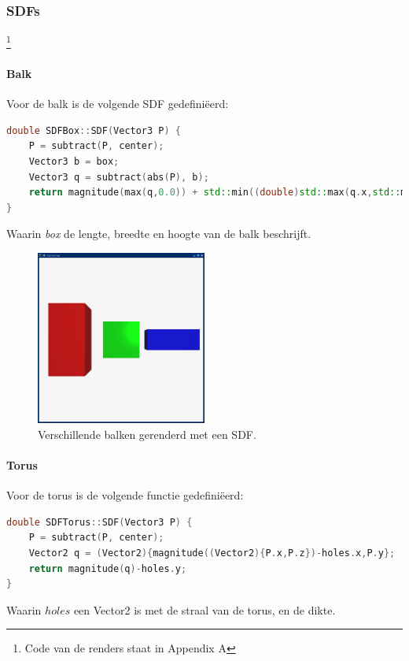 \documentclass[12pt, a4paper]{article}
\begin{document}
\subsubsection{SDFs}\footnote{Code van de renders staat in Appendix A}

\paragraph{Balk}
Voor de balk is de volgende SDF gedefiniëerd:
\begin{lstlisting}[language=C++]
double SDFBox::SDF(Vector3 P) {
    P = subtract(P, center);
    Vector3 b = box;
    Vector3 q = subtract(abs(P), b);
    return magnitude(max(q,0.0)) + std::min((double)std::max(q.x,std::max(q.y,q.z)),0.0);
}
\end{lstlisting}
Waarin \emph{box} de lengte, breedte en hoogte van de balk beschrijft.

\begin{figure}[H]
    \centering
    \includegraphics[width=0.50\textwidth]{renders/boxes.png}
    \caption{Verschillende balken gerenderd met een SDF.}
    \label{fig:boxes}
\end{figure}

\paragraph{Torus}
Voor de torus is de volgende functie gedefiniëerd:
\begin{lstlisting}[language=C++]
double SDFTorus::SDF(Vector3 P) {
    P = subtract(P, center);
    Vector2 q = (Vector2){magnitude((Vector2){P.x,P.z})-holes.x,P.y};
    return magnitude(q)-holes.y;
}
\end{lstlisting}

Waarin $holes$ een Vector2 is met de straal van de torus, en de dikte.
\end{document}

